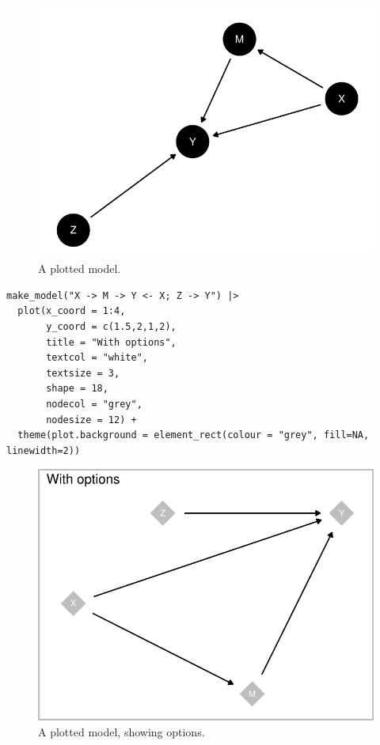 \documentclass[
  article]{jss}
\begin{document}
\begin{figure}[H]

{\centering \includegraphics{paper_files/figure-pdf/unnamed-chunk-14-1.pdf}

}

\caption{A plotted model.}

\end{figure}

\begin{verbatim}
make_model("X -> M -> Y <- X; Z -> Y") |>
  plot(x_coord = 1:4,
       y_coord = c(1.5,2,1,2),
       title = "With options",
       textcol = "white",
       textsize = 3,
       shape = 18,
       nodecol = "grey",
       nodesize = 12) +
  theme(plot.background = element_rect(colour = "grey", fill=NA, linewidth=2))
\end{verbatim}

\begin{figure}[H]

{\centering \includegraphics{paper_files/figure-pdf/unnamed-chunk-16-1.pdf}

}

\caption{A plotted model, showing options.}

\end{figure}
\end{document}
